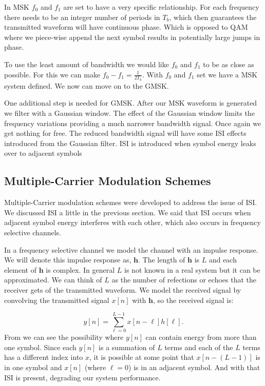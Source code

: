 In \ac{MSK} $f_0$ and $f_1$ are set to have a very specific relationship. For each frequency there needs to be an integer number of periods in $T_b$, which then guarantees the transmitted waveform will have continuous phase. Which is opposed to \ac{QAM} where we piece-wise append the next symbol results in potentially large jumps in phase.

To use the least amount of bandwidth we would like $f_0$ and $f_1$ to be as close as possible. For this we can make $f_0-f_1=\frac{1}{2T_b}$. With $f_0$ and $f_1$ set we have a \ac{MSK} system defined. We now can move on to the \ac{GMSK}.

One additional step is needed for \ac{GMSK}. After our \ac{MSK} waveform is generated we filter with a Gaussian window. The effect of the Gaussian window limits the frequency variations providing a much narrower bandwidth signal. Once again we get nothing for free. The reduced bandwidth signal will have some \ac{ISI} effects introduced from the Gaussian filter. \ac{ISI} is introduced when symbol energy leaks over to adjacent symbols \cite{Skl01}

	
	
\subsection{Multiple-Carrier Modulation Schemes}

Multiple-Carrier modulation schemes were developed to address the issue of \ac{ISI}. We discussed \ac{ISI} a little in the previous section. We said that \ac{ISI} occurs when adjacent symbol energy interferes with each other, which also occurs in frequency selective channels.

In a frequency selective channel we model the channel with an impulse response. We will denote this impulse response as, $\mathbf{h}$. The length of $\mathbf{h}$ is $L$ and each element of $\mathbf{h}$ is complex. In general $L$ is not known in a real system but it can be approximated. We can think of $L$ as the number of refections or echoes that the receiver gets of the transmitted waveform. We model the received signal by convolving the transmitted signal $x[n]$ with $\mathbf{h}$, so the received signal is:

\begin{equation}
\label{eq:conv}
y[n] = \sum_{\ell=0}^{L-1}x[n-\ell]h[\ell].
\end{equation}
\noindent
From  we can see the possibility where $y[n]$ can contain energy from more than one symbol. Since each $y[n]$ is a summation of $L$ terms and each of the $L$ terms has a different index into $x$, it is possible at some point that $x[n-(L-1)]$ is in one symbol and $x[n]$ (where $\ell=0$) is in an adjacent symbol. And with that \ac{ISI} is present, degrading our system performance.

